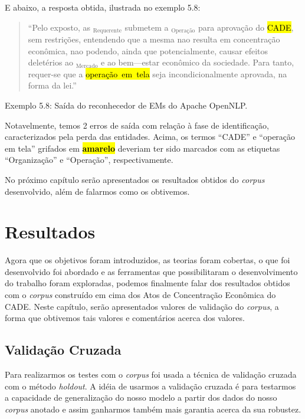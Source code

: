 \documentclass[11pt]{report}
\newcommand{\quotes}[1]{``#1''}
\begin{document}
E abaixo, a resposta obtida, ilustrada no exemplo 5.8:

\begin{quote}
  \quotes{Pelo exposto, as $_{\text{Requerente}}$ submetem a \fbox{presente operação}$_{\text{Operação}}$ para aprovação do \hl{\mbox{CADE}}, sem restrições,
  entendendo que a mesma nao resulta em concentração econômica, nao podendo, ainda que potencialmente, causar efeitos deletérios ao \fbox{mercado}$_{\text{Mercado}}$ e
  ao bem—estar econômico da sociedade. Para tanto, requer-se que a \hl{\mbox{operação em tela}} seja incondicionalmente aprovada, na forma da lei.}
\end{quote}
\begin{center}
  Exemplo 5.8: Saída do reconhecedor de EMs do Apache OpenNLP.
\end{center}

Notavelmente, temos 2 erros de saída com relação à fase de identificação, caracterizados pela perda das entidades. Acima, os termos \quotes{CADE} e \quotes{operação em tela}
grifados em \hl{\textbf{amarelo}} deveriam ter sido marcados com as etiquetas \quotes{Organização} e \quotes{Operação}, respectivamente.

No próximo capítulo serão apresentados os resultados obtidos do \textit{corpus} desenvolvido, além de falarmos como os obtivemos.

\pagebreak
\chapter{Resultados}

\indent\indent Agora que os objetivos foram introduzidos, as teorias foram cobertas, o que foi desenvolvido foi abordado e as ferramentas que possibilitaram o desenvolvimento do trabalho
foram exploradas, podemos finalmente falar dos resultados obtidos com o \textit{corpus} construído em cima dos Atos de Concentração Econômica do CADE. Neste capítulo, serão apresentados
valores de validação do \textit{corpus}, a forma que obtivemos tais valores e comentários acerca dos valores.

\section{Validação Cruzada}

\indent\indent Para realizarmos os testes com o \textit{corpus} foi usada a técnica de validação cruzada com o método \textit{holdout}. A idéia de usarmos a validação cruzada
é para testarmos a capacidade de generalização do nosso modelo a partir dos dados do nosso \textit{corpus} anotado e assim ganharmos também mais garantia acerca da sua robustez.
\end{document}
